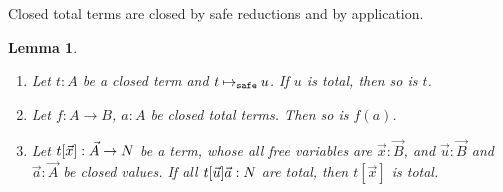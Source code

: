 \documentclass{article}
\newtheorem{lemma}[theorem]{Lemma}
\begin{document}
Closed total terms are closed by safe reductions and by application. 

\begin{lemma}\label{lem:total_value}
  \begin{enumerate}
  \item\label{lem:total_value1}
    Let $t:A$ be a closed term and $t \mathbin{{\mapsto}_{\tiny \tt safe}} u$.
    If $u$ is total, then so is $t$.
  \item\label{lem:total_value1bis}
    Let $f:A \rightarrow B$, $a:A$ be closed \emph{total} terms.
    Then so is $f(a)$.
  \item\label{lem:total_value2}
    Let $t[\vec{x}]:\vec{A}\rightarrow{N}$ be a term,
    whose all free variables are $\vec{x}:\vec{B}$,
    and $\vec{u}:\vec{B}$ and $\vec{a}:\vec{A}$ be closed values.
    If all $t[\vec{u}]\vec{a}:{N}$ are total, then $t[\vec{x}]$ is total. 
  \end{enumerate}
\end{lemma}
\end{document}
